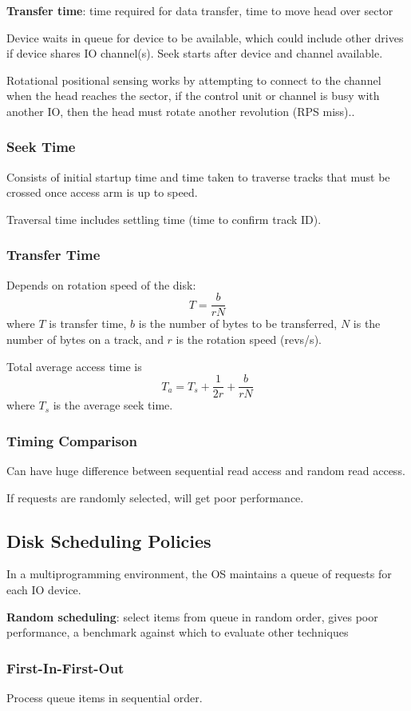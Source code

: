 \documentclass[11pt]{article}
\begin{document}
\textbf{Transfer time}: time required for data transfer, time to move head over sector

Device waits in queue for device to be available, which could include other drives if device
shares IO channel(s). Seek starts after device and channel available.

Rotational positional sensing works by attempting to connect to the channel when the head reaches
the sector, if the control unit or channel is busy with another IO, then the head must rotate another
revolution (RPS miss)..
\subsubsection{Seek Time}
\label{sec:org02f4d09}
Consists of initial startup time and time taken to traverse tracks that must be crossed once access
arm is up to speed.

Traversal time includes settling time (time to confirm track ID).
\subsubsection{Transfer Time}
\label{sec:org0bd655c}
Depends on rotation speed of the disk:
$$
T = \frac{b}{rN}
$$
where \(T\) is transfer time, \(b\) is the number of bytes to be transferred, \(N\) is the number of
bytes on a track, and \(r\) is the rotation speed (revs/s).

Total average access time is
$$
T_{a} = T_{s} + \frac{1}{2r} + \frac{b}{rN}
$$
where \(T_{s}\) is the average seek time.
\subsubsection{Timing Comparison}
\label{sec:orgea2d391}
Can have huge difference between sequential read access and random read access.

If requests are randomly selected, will get poor performance.
\subsection{Disk Scheduling Policies}
\label{sec:org4ae399c}
In a multiprogramming environment, the OS maintains a queue of requests for each IO device.

\textbf{Random scheduling}: select items from queue in random order, gives poor performance, a
benchmark against which to evaluate other techniques
\subsubsection{First-In-First-Out}
\label{sec:org7a95d5d}
Process queue items in sequential order.
\end{document}

